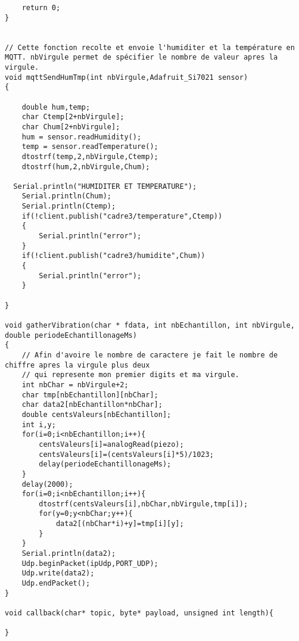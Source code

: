 \begin{scriptsize}
\begin{lstlisting}
	return 0;
}


// Cette fonction recolte et envoie l'humiditer et la température en MQTT. nbVirgule permet de spécifier le nombre de valeur apres la virgule.
void mqttSendHumTmp(int nbVirgule,Adafruit_Si7021 sensor)
{

	double hum,temp;
	char Ctemp[2+nbVirgule];
	char Chum[2+nbVirgule];
	hum = sensor.readHumidity();
	temp = sensor.readTemperature();
	dtostrf(temp,2,nbVirgule,Ctemp);
	dtostrf(hum,2,nbVirgule,Chum);
  
  Serial.println("HUMIDITER ET TEMPERATURE");
	Serial.println(Chum);
	Serial.println(Ctemp);
	if(!client.publish("cadre3/temperature",Ctemp))
	{
		Serial.println("error");
	}
	if(!client.publish("cadre3/humidite",Chum))
	{
		Serial.println("error");
	}

}

void gatherVibration(char * fdata, int nbEchantillon, int nbVirgule, double periodeEchantillonageMs)
{
	// Afin d'avoire le nombre de caractere je fait le nombre de chiffre apres la virgule plus deux
	// qui represente mon premier digits et ma virgule.
	int nbChar = nbVirgule+2;
	char tmp[nbEchantillon][nbChar];
	char data2[nbEchantillon*nbChar];
	double centsValeurs[nbEchantillon];
	int i,y;
	for(i=0;i<nbEchantillon;i++){
		centsValeurs[i]=analogRead(piezo);
		centsValeurs[i]=(centsValeurs[i]*5)/1023;
		delay(periodeEchantillonageMs);
	}
	delay(2000);
	for(i=0;i<nbEchantillon;i++){
		dtostrf(centsValeurs[i],nbChar,nbVirgule,tmp[i]);
		for(y=0;y<nbChar;y++){
			data2[(nbChar*i)+y]=tmp[i][y];
		}	
	}
	Serial.println(data2);
	Udp.beginPacket(ipUdp,PORT_UDP);
	Udp.write(data2);
	Udp.endPacket();
}

void callback(char* topic, byte* payload, unsigned int length){

}
\end{lstlisting}
\end{scriptsize} 
